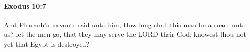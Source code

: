 
		\paragraph{Exodus 10:7} %
			\label{EXODUS-10-7}

			And Pharaoh's servants said unto him, How long shall this man be a snare unto us? let the men go, that they may serve the LORD their God: knowest thou not yet that Egypt is destroyed?


